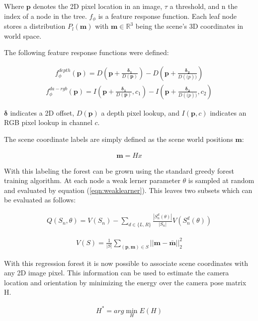 Where $\mathbf{p}$ denotes the 2D pixel location in an image, $\tau$ a threshold, and n the index of a node in the tree. $f_{\phi}$ is a feature response function. Each leaf node stores a distribution $P_{l}(\mathbf{m})$ with $\mathbf{m} \in \mathbb{R}^3$ being the scene's 3D coordinates in world space.

The following feature response functions were defined:

\begin{eqnarray}
  f_{\phi}^{depth}(\mathbf{p}) = D(\mathbf{p} + \frac{\mathbf{\delta_1}}{D(\mathbf{p})}) - D(\mathbf{p} + \frac{\mathbf{\delta_2}}{D(\mathbf(p))})
\end{eqnarray}
\begin{eqnarray}
  f_{\phi}^{da-rgb}(\mathbf{p}) = I(\mathbf{p} + \frac{\mathbf{\delta_1}}{D(\mathbf{p})},c_1) - I(\mathbf{p} + \frac{\mathbf{\delta_2}}{D(\mathbf(p))},c_2)
\end{eqnarray}

$\mathbf{\delta}$ indicates a 2D offset, $D(\mathbf{p})$ a depth pixel lookup, and $I(\mathbf{p},c)$ indicates an RGB pixel lookup in channel $c$.

The scene coordinate labels are simply defined as the scene world positions $\mathbf{m}$:

\begin{eqnarray*}
  \mathbf{m} = Hx
\end{eqnarray*}

With this labeling the forest can be grown using the standard greedy forest training algorithm. At each node a weak lerner parameter $\theta$ is sampled at random and evaluated by equation (\ref{eqn:weaklearner}). This leaves two subsets which can be evaluated as follows:


\begin{eqnarray}
  Q(S_n,\theta) = V(S_n) - \sum_{d\in\{L,R\}}{\frac{|S_n^d(\theta)|}{|S_n|}V(S_n^d(\theta))}
\end{eqnarray}

\begin{eqnarray}
  V(S) = \frac{1}{|S|} \sum_{(\mathbf{p},\mathbf{m}) \in S}{||\mathbf{m} - \mathbf{\bar m}||_2^2}
\end{eqnarray}

With this regression forest it is now possible to associate scene coordinates with any 2D image pixel. This information can be used to estimate the camera location and orientation by minimizing the energy over the camera pose matrix H.

\begin{eqnarray}
  H^{*} = arg\min_H E(H)
\end{eqnarray} 

